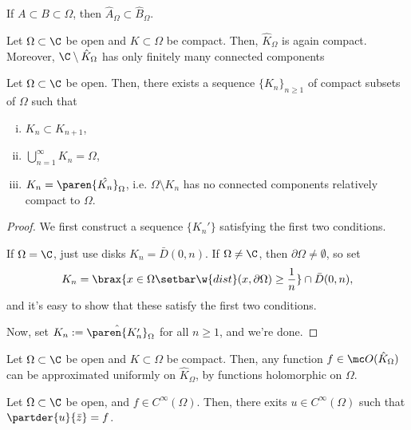 \documentclass[11pt]{report}
\begin{document}
\begin{exercise}
    If $A \subset B \subset \Omega$, then $\hat A_\Omega \subset \hat B_\Omega$.
\end{exercise}

\begin{prop}
    Let $\Omega \subset \C$ be open and $K \subset \Omega$ be compact. Then, $\hat K_\Omega$ is again compact. Moreover, $\C \setminus \hat K_\Omega$ has only finitely many connected components
\end{prop}

\begin{lem}[][label=lem:compact_seq]
    Let $\Omega \subset \C$ be open. Then, there exists a sequence $\{K_n\}_{n \geq 1}$ of compact subsets of $\Omega$ such that 
    \begin{enumerate}[(i)]
        \item $K_n \subset K_{n+1}$,
        \item $\bigcup_{n=1}^\infty K_n = \Omega$,
        \item $K_n = \paren{\hat {K_n}}_\Omega$, i.e. $\Omega \setminus K_n$ has no connected components relatively compact to $\Omega$.
    \end{enumerate}
\end{lem}

\begin{proof}
    We first construct a sequence $\{K_n'\}$ satisfying the first two conditions. 

    If $\Omega = \C$, just use disks $K_n = \bar D(0,n)$. If $\Omega \neq \C$, then $\partial \Omega \neq \emptyset$, so set 
    $$K_n =\brax{x \in \Omega \setbar \w{dist}(x,\partial \Omega) \geq \frac{1}{n}}\cap \bar D(0,n),$$
    and it's easy to show that these satisfy the first two conditions.

    Now, set $K_n := \hat{\paren{K_n'}}_\Omega$ for all $n \geq 1$, and we're done.
\end{proof}

\begin{thm}
    Let $\Omega \subset \C$ be open and $K \subset \Omega$ be compact. Then, any function $f \in \mc O(\hat K_\Omega)$ can be approximated uniformly on $\hat K_\Omega$, by functions holomorphic on $\Omega$.
\end{thm}

\begin{thm}[][label=thm:grothmagic]
    Let $\Omega \subset \C$ be open, and $f \in C^\infty (\Omega)$. Then, there exits $u \in C^\infty (\Omega)$ such that $\partder{u}{\bar z}=f$.
\end{thm}
\end{document}
